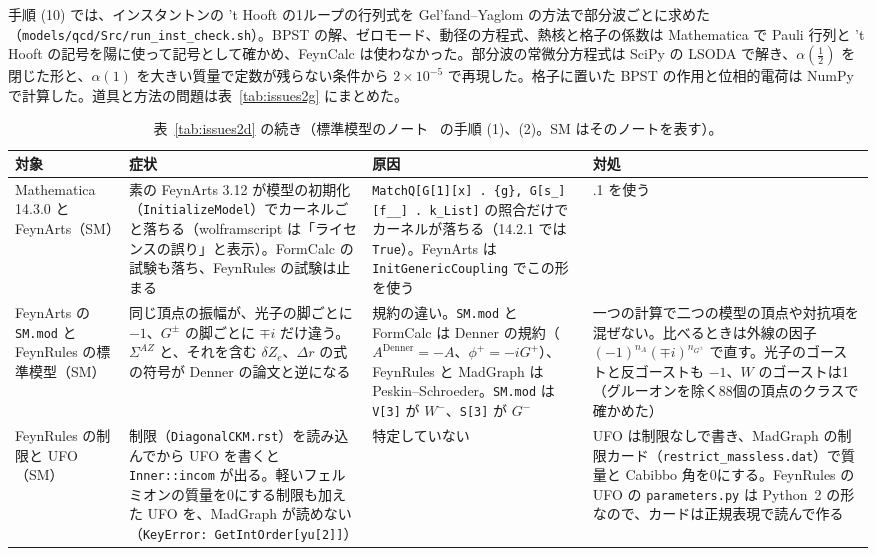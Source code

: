 \documentclass[a4paper,10pt]{ltjsarticle}
\begin{document}
手順 (10) では、インスタントンの 't Hooft の1ループの行列式を Gel'fand--Yaglom の方法で部分波ごとに求めた（\nolinkurl{models/qcd/Src/run_inst_check.sh}）。BPST の解、ゼロモード、動径の方程式、熱核と格子の係数は Mathematica で Pauli 行列と 't Hooft の記号を陽に使って記号として確かめ、FeynCalc は使わなかった。部分波の常微分方程式は SciPy の LSODA で解き、$\alpha(\frac12)$ を閉じた形と、$\alpha(1)$ を大きい質量で定数が残らない条件から $2\times10^{-5}$ で再現した。格子に置いた BPST の作用と位相的電荷は NumPy で計算した。道具と方法の問題は表~\ref{tab:issues2g} にまとめた。

\begin{table}[tbp]
\centering\footnotesize
\caption{表~\ref{tab:issues2d} の続き（標準模型のノート~\cite{smnote} の手順 (1)、(2)。SM はそのノートを表す）。}
\label{tab:issues2e}
\begin{tabularx}{\linewidth}{>{\raggedright\arraybackslash}p{2.4cm}>{\raggedright\arraybackslash}X>{\raggedright\arraybackslash}X>{\raggedright\arraybackslash}X}
\toprule
\textbf{対象} & \textbf{症状} & \textbf{原因} & \textbf{対処} \\
\midrule
Mathematica 14.3.0 と FeynArts（SM） & 素の FeynArts 3.12 が模型の初期化（\texttt{InitializeModel}）でカーネルごと落ちる（wolframscript は「ライセンスの誤り」と表示）。FormCalc の試験も落ち、FeynRules の試験は止まる & \texttt{MatchQ[G[1][x] . \{g\}, G[s\_][f\_\_] . k\_List]} の照合だけでカーネルが落ちる（14.2.1 では \texttt{True}）。FeynArts は \texttt{InitGenericCoupling} でこの形を使う & 14.2.1 を使う \\
FeynArts の \texttt{SM.mod} と FeynRules の標準模型（SM） & 同じ頂点の振幅が、光子の脚ごとに $-1$、$G^\pm$ の脚ごとに $\mp i$ だけ違う。$\Sigma^{AZ}$ と、それを含む $\delta Z_e$、$\Delta r$ の式の符号が Denner の論文と逆になる & 規約の違い。\texttt{SM.mod} と FormCalc は Denner の規約（$A^{\mathrm{Denner}}=-A$、$\phi^+=-iG^+$）、FeynRules と MadGraph は Peskin--Schroeder。\texttt{SM.mod} は \texttt{V[3]} が $W^-$、\texttt{S[3]} が $G^-$ & 一つの計算で二つの模型の頂点や対抗項を混ぜない。比べるときは外線の因子 $(-1)^{n_A}(\mp i)^{n_{G^\pm}}$ で直す。光子のゴーストと反ゴーストも $-1$、$W$ のゴーストは1（グルーオンを除く88個の頂点のクラスで確かめた） \\
FeynRules の制限と UFO（SM） & 制限（\texttt{DiagonalCKM.rst}）を読み込んでから UFO を書くと \texttt{Inner::incom} が出る。軽いフェルミオンの質量を0にする制限も加えた UFO を、MadGraph が読めない（\texttt{KeyError: GetIntOrder[yu[2]]}） & 特定していない & UFO は制限なしで書き、MadGraph の制限カード（\texttt{restrict\_massless.dat}）で質量と Cabibbo 角を0にする。FeynRules の UFO の \texttt{parameters.py} は Python~2 の形なので、カードは正規表現で読んで作る \\

\end{tabularx}
\end{table}
\end{document}
